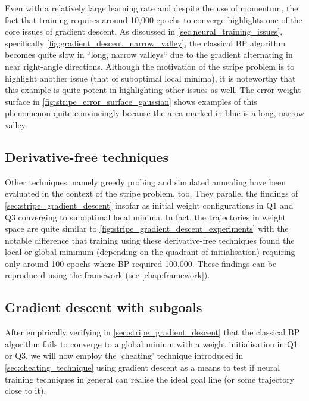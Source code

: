 Even with a relatively large learning rate and despite the use of momentum, the fact that training requires around 10,000 epochs to converge highlights one of the core issues of gradient descent.
As discussed in \ref{sec:neural_training_issues}, specifically \ref{fig:gradient_descent_narrow_valley}, the classical BP algorithm becomes quite slow in ``long, narrow valleys`` \cite[421]{press1992} due to the gradient alternating in near right-angle directions.
Although the motivation of the stripe problem is to highlight another issue (that of suboptimal local minima), it is noteworthy that this example is quite potent in highlighting other issues as well.
The error-weight surface in \ref{fig:stripe_error_surface_gaussian} shows examples of this phenomenon quite convincingly because the area marked in blue is a long, narrow valley.

\subsection{Derivative-free techniques}
\label{sec:local_minimum_experiments_derivative_free}
Other techniques, namely greedy probing and simulated annealing have been evaluated in the context of the stripe problem, too.
They parallel the findings of \ref{sec:stripe_gradient_descent} insofar as initial weight configurations in Q1 and Q3 converging to suboptimal local minima.
In fact, the trajectories in weight space are quite similar to \ref{fig:stripe_gradient_descent_experiments} with the notable difference that training using these derivative-free techniques found the local or global minimum (depending on the quadrant of initialisation) requiring only around 100 epochs where BP required 100,000. 
These findings can be reproduced using the framework (see \ref{chap:framework}).

\subsection{Gradient descent with subgoals}
\label{sec:stripe_gradient_descent_subgoals}
After empirically verifying in \ref{sec:stripe_gradient_descent} that the classical BP algorithm fails to converge to a global minium with a weight initialisation in Q1 or Q3, we will now employ the `cheating' technique introduced in \ref{sec:cheating_technique} using gradient descent as a means to test if neural training techniques in general can realise the ideal goal line (or some trajectory close to it).

